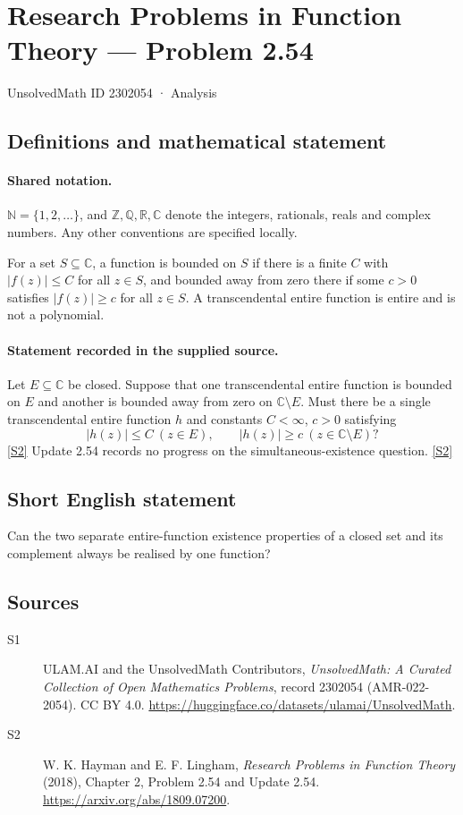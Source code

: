 \documentclass[11pt]{article}
\newcommand{\sref}[2]{\hyperlink{source:#1:#2}{[S#2]}}
\begin{document}
\setcounter{section}{2302053}
\section{Research Problems in Function Theory — Problem 2.54}\label{2302054}
{\small\sffamily UnsolvedMath ID 2302054 · Analysis}
\subsection{Definitions and mathematical statement}

\paragraph{Shared notation.}$\mathbb N=\{1,2,\ldots\}$, and $\mathbb Z,\mathbb Q,\mathbb R,\mathbb C$ denote the integers, rationals, reals and complex numbers. Any other conventions are specified locally.


For a set $S\subseteq\mathbb C$, a function is bounded on $S$ if there is a finite $C$ with $|f(z)|\le C$ for all $z\in S$, and bounded away from zero there if some $c>0$ satisfies $|f(z)|\ge c$ for all $z\in S$. A transcendental entire function is entire and is not a polynomial.

\paragraph{Statement recorded in the supplied source.}
Let $E\subseteq\mathbb C$ be closed. Suppose that one transcendental entire function is bounded on $E$ and another is bounded away from zero on $\mathbb C\setminus E$.
Must there be a single transcendental entire function $h$ and constants $C<\infty$, $c>0$ satisfying
\[|h(z)|\le C\ (z\in E),\qquad |h(z)|\ge c\ (z\in\mathbb C\setminus E)?\] \sref{2302054}{2}
Update 2.54 records no progress on the simultaneous-existence question. \sref{2302054}{2}
\subsection{Short English statement}
Can the two separate entire-function existence properties of a closed set and its complement always be realised by one function?
\subsection{Sources}
\begin{description}
\item[\hypertarget{source:2302054:1}{S1}] ULAM.AI and the UnsolvedMath Contributors, \emph{UnsolvedMath: A Curated Collection of Open Mathematics Problems}, record 2302054 (AMR-022-2054). CC BY 4.0. \url{https://huggingface.co/datasets/ulamai/UnsolvedMath}.
\item[\hypertarget{source:2302054:2}{S2}] W. K. Hayman and E. F. Lingham, \emph{Research Problems in Function Theory} (2018), Chapter 2, Problem 2.54 and Update 2.54. \url{https://arxiv.org/abs/1809.07200}.
\end{description}
\label{end:2302054}
\end{document}
